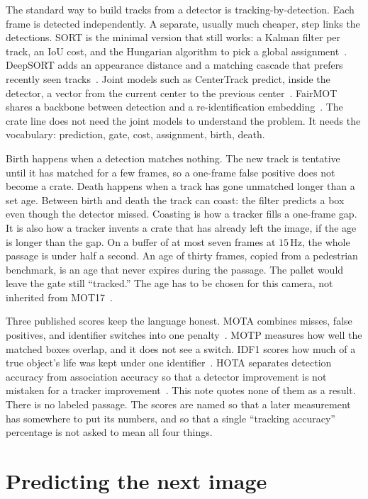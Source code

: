 \documentclass[11pt,a4paper]{article}
\begin{document}
The standard way to build tracks from a detector is tracking-by-detection. Each frame is detected independently. A separate, usually much cheaper, step links the detections. SORT is the minimal version that still works: a Kalman filter per track, an IoU cost, and the Hungarian algorithm to pick a global assignment~\cite{bewley2016sort,kuhn1955hungarian}. DeepSORT adds an appearance distance and a matching cascade that prefers recently seen tracks~\cite{wojke2017deepsort}. Joint models such as CenterTrack predict, inside the detector, a vector from the current center to the previous center~\cite{zhou2020centertrack}. FairMOT shares a backbone between detection and a re-identification embedding~\cite{zhang2021fairmot}. The crate line does not need the joint models to understand the problem. It needs the vocabulary: prediction, gate, cost, assignment, birth, death.

Birth happens when a detection matches nothing. The new track is tentative until it has matched for a few frames, so a one-frame false positive does not become a crate. Death happens when a track has gone unmatched longer than a set age. Between birth and death the track can coast: the filter predicts a box even though the detector missed. Coasting is how a tracker fills a one-frame gap. It is also how a tracker invents a crate that has already left the image, if the age is longer than the gap. On a buffer of at most seven frames at $15\,\mathrm{Hz}$, the whole passage is under half a second. An age of thirty frames, copied from a pedestrian benchmark, is an age that never expires during the passage. The pallet would leave the gate still ``tracked.'' The age has to be chosen for this camera, not inherited from MOT17~\cite{milan2016mot16}.

Three published scores keep the language honest. MOTA combines misses, false positives, and identifier switches into one penalty~\cite{bernardin2008clear}. MOTP measures how well the matched boxes overlap, and it does not see a switch. IDF1 scores how much of a true object's life was kept under one identifier~\cite{ristani2016id}. HOTA separates detection accuracy from association accuracy so that a detector improvement is not mistaken for a tracker improvement~\cite{luiten2021hota}. This note quotes none of them as a result. There is no labeled passage. The scores are named so that a later measurement has somewhere to put its numbers, and so that a single ``tracking accuracy'' percentage is not asked to mean all four things.

\section{Predicting the next image}
\label{sec:kalman}
\end{document}
